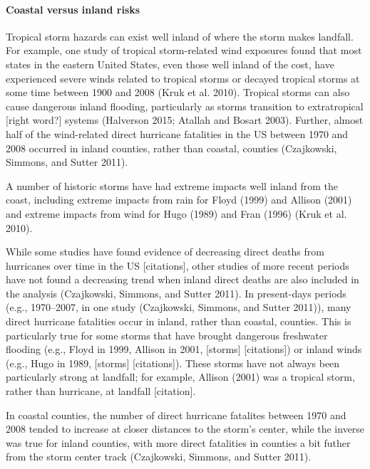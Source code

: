 \documentclass[]{elsarticle} %
\begin{document}
\paragraph{Coastal versus inland
risks}\label{coastal-versus-inland-risks}

Tropical storm hazards can exist well inland of where the storm makes
landfall. For example, one study of tropical storm-related wind
exposures found that most states in the eastern United States, even
those well inland of the cost, have experienced severe winds related to
tropical storms or decayed tropical storms at some time between 1900 and
2008 (Kruk et al. 2010). Tropical storms can also cause dangerous inland
flooding, particularly as storms transition to extratropical {[}right
word?{]} systems (Halverson 2015; Atallah and Bosart 2003). Further,
almost half of the wind-related direct hurricane fatalities in the US
between 1970 and 2008 occurred in inland counties, rather than coastal,
counties (Czajkowski, Simmons, and Sutter 2011).

A number of historic storms have had extreme impacts well inland from
the coast, including extreme impacts from rain for Floyd (1999) and
Allison (2001) and extreme impacts from wind for Hugo (1989) and Fran
(1996) (Kruk et al. 2010).

While some studies have found evidence of decreasing direct deaths from
hurricanes over time in the US {[}citations{]}, other studies of more
recent periods have not found a decreasing trend when inland direct
deaths are also included in the analysis (Czajkowski, Simmons, and
Sutter 2011). In present-days periods (e.g., 1970--2007, in one study
(Czajkowski, Simmons, and Sutter 2011)), many direct hurricane
fatalities occur in inland, rather than coastal, counties. This is
particularly true for some storms that have brought dangerous freshwater
flooding (e.g., Floyd in 1999, Allison in 2001, {[}storms{]}
{[}citations{]}) or inland winds (e.g., Hugo in 1989, {[}storms{]}
{[}citations{]}). These storms have not always been particularly strong
at landfall; for example, Allison (2001) was a tropical storm, rather
than hurricane, at landfall {[}citation{]}.

In coastal counties, the number of direct hurricane fatalites between
1970 and 2008 tended to increase at closer distances to the storm's
center, while the inverse was true for inland counties, with more direct
fatalities in counties a bit futher from the storm center track
(Czajkowski, Simmons, and Sutter 2011).
\end{document}
